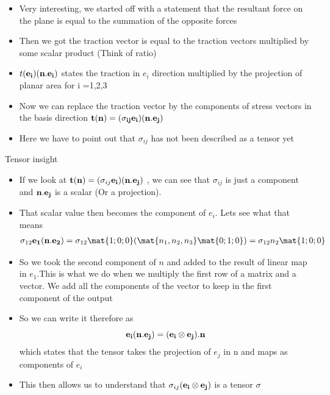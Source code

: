 	\begin{frame}
		\begin{itemize}
			\item Very interesting, we started off with a statement that the resultant force on the plane is equal to the summation of the opposite forces
			\item Then we got the traction vector is equal to the traction vectors multiplied by some scalar product (Think of ratio)
			\item $t(\mathbf{e_i})(\mathbf{n.e_i})$ states the traction in $e_i$ direction multiplied by the projection of planar area for i =1,2,3
			\item Now we can replace the traction vector by the components of stress vectors in the basis direction $\mathbf{t(n)} = (\mathbf{\sigma_{ij}e_i})(\mathbf{n.e_j})$
			\item Here we have to point out that $\sigma_{ij}$ has not been described as a tensor yet\\		
		\end{itemize}
	\end{frame}

	\begin{frame}{Tensor insight}
		\begin{itemize}
			\item If we look at $\mathbf{t(n)} = (\sigma_{ij}\mathbf{e_i})(\mathbf{n.e_j})$ , we can see that $\sigma_{ij}$ is just a component and $\mathbf{n.e_j}$ is a scalar (Or a projection).
			\item That scalar value then becomes the component of $e_i$. Lets see what that means 
			\begin{equation}
			\begin{aligned}
			\sigma_{12}\ve{e_1(n.e_2)}= \sigma_{12}\mat{1;0;0}(\mat{n_1,n_2,n_3}\mat{0;1;0}) = \sigma_{12} n_2 \mat{1;0;0}
			\end{aligned}
			\end{equation}
			\item So we took the second component of $n$ and added to the result of linear map in $e_1$.This is what we do when we multiply the first row of a matrix and a vector. We add all the components of the vector to keep in the first component of the output
			\item So we can write it therefore as
			\begin{equation}
				\mathbf{e_i(n.e_j) = (e_i \otimes e_j).n} 
			\end{equation}
			which states that the tensor takes the projection of $e_j$ in n and maps as components of $e_i$
			\item This then allows us to understand that $\sigma_{ij}(\mathbf{e_i \otimes e_j})$ is a tensor $\sigma$
		\end{itemize}
	\end{frame}

